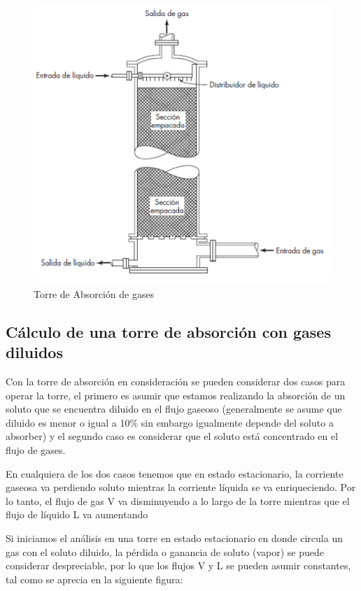 \documentclass[11pt]{book}
\begin{document}
\begin{figure}[H]
    \centering
    \includegraphics{img/absorcion/Absorcion_4.PNG}
    \caption{Torre de Absorción de gases}
    \label{fig:Absorcion_4}
\end{figure}

\subsection{Cálculo de una torre de absorción con gases diluidos}


Con la torre de absorción en consideración se pueden considerar dos casos para operar la torre, el primero es asumir que estamos realizando la absorción de un soluto que se encuentra diluido en el flujo gaseoso (generalmente se asume que diluido es menor o igual a 10\% sin embargo igualmente depende del soluto a absorber) y el segundo caso es considerar que el soluto está concentrado en el flujo de gases. 

En cualquiera de los dos casos tenemos que en estado estacionario, la corriente gaseosa va perdiendo soluto mientras la corriente líquida se va enriqueciendo. Por lo tanto, el flujo de gas V va disminuyendo a lo largo de la torre mientras que el flujo de líquido L va aumentando

Si iniciamos el análisis en una torre en estado estacionario en donde circula un gas con el soluto diluido,  la pérdida o ganancia de soluto (vapor) se puede considerar despreciable, por lo que los flujos V y L se pueden asumir constantes, tal como se aprecia en la siguiente figura:
\end{document}
